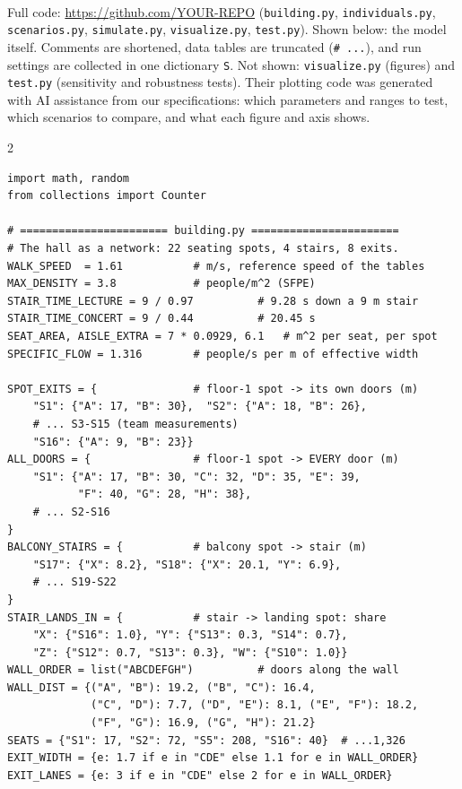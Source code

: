 \documentclass[10pt]{article}
\begin{document}
\\[2pt]
{\small Full code: \url{https://github.com/YOUR-REPO} (\texttt{building.py}, \texttt{individuals.py}, \texttt{scenarios.py}, \texttt{simulate.py}, \texttt{visualize.py}, \texttt{test.py}).
Shown below: the model itself. Comments are shortened, data tables are truncated (\texttt{\# ...}), and run settings are collected in one dictionary \texttt{S}.
Not shown: \texttt{visualize.py} (figures) and \texttt{test.py} (sensitivity and robustness tests). Their plotting code was generated with AI assistance from our specifications: which parameters and ranges to test, which scenarios to compare, and what each figure and axis shows.}
\vspace{4pt}
\begin{multicols*}{2}
\begin{lstlisting}
import math, random
from collections import Counter

# ======================= building.py =======================
# The hall as a network: 22 seating spots, 4 stairs, 8 exits.
WALK_SPEED  = 1.61           # m/s, reference speed of the tables
MAX_DENSITY = 3.8            # people/m^2 (SFPE)
STAIR_TIME_LECTURE = 9 / 0.97          # 9.28 s down a 9 m stair
STAIR_TIME_CONCERT = 9 / 0.44          # 20.45 s
SEAT_AREA, AISLE_EXTRA = 7 * 0.0929, 6.1   # m^2 per seat, per spot
SPECIFIC_FLOW = 1.316        # people/s per m of effective width

SPOT_EXITS = {               # floor-1 spot -> its own doors (m)
    "S1": {"A": 17, "B": 30},  "S2": {"A": 18, "B": 26},
    # ... S3-S15 (team measurements)
    "S16": {"A": 9, "B": 23}}
ALL_DOORS = {                # floor-1 spot -> EVERY door (m)
    "S1": {"A": 17, "B": 30, "C": 32, "D": 35, "E": 39,
           "F": 40, "G": 28, "H": 38},
    # ... S2-S16
}
BALCONY_STAIRS = {           # balcony spot -> stair (m)
    "S17": {"X": 8.2}, "S18": {"X": 20.1, "Y": 6.9},
    # ... S19-S22
}
STAIR_LANDS_IN = {           # stair -> landing spot: share
    "X": {"S16": 1.0}, "Y": {"S13": 0.3, "S14": 0.7},
    "Z": {"S12": 0.7, "S13": 0.3}, "W": {"S10": 1.0}}
WALL_ORDER = list("ABCDEFGH")          # doors along the wall
WALL_DIST = {("A", "B"): 19.2, ("B", "C"): 16.4,
             ("C", "D"): 7.7, ("D", "E"): 8.1, ("E", "F"): 18.2,
             ("F", "G"): 16.9, ("G", "H"): 21.2}
SEATS = {"S1": 17, "S2": 72, "S5": 208, "S16": 40}  # ...1,326
EXIT_WIDTH = {e: 1.7 if e in "CDE" else 1.1 for e in WALL_ORDER}
EXIT_LANES = {e: 3 if e in "CDE" else 2 for e in WALL_ORDER}



\end{lstlisting}
\end{multicols*}
\end{document}
